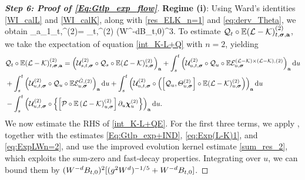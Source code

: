 \begin{proof}[\bf Step 6: Proof of \eqref{Eq:Gtlp_exp_flow}]
\noindent
\textbf{Regime (i)}: Using Ward's identities \eqref{WI_calL} and \eqref{WI_calK}, along with \eqref{res_ELK_n=1} and \eqref{eq:derv_Theta}, we obtain 
\be\label{eq:EPL-K}
_{a_1}\dthn_{t,\ba}^{(2)}= \dthn_{t,\ba}^{(2)} \prec (W^{-d}B_{t,0})^{3}.
\ee
To estimate $\mathcal Q_t\circ \mathbb{E} (\mathcal{L} - \mathcal{K})^{(2)}_{t, {\boldsymbol{\sigma}}, {\mathbf{a}}}$, we take the expectation of equation \eqref{int_K-L+Q} with $n=2$, yielding
\begin{align}\label{int_K-L+QE}
& {\mathcal Q}_t\circ  \mathbb{E}(\mathcal{L} - \mathcal{K})^{(2)}_{t, {\boldsymbol{\sigma}}, {\mathbf{a}}}   = 
\left(\mathcal{U}^{(2)}_{s, t, {\boldsymbol{\sigma}}} \circ  {\mathcal Q}_s\circ \mathbb{E}(\mathcal{L} - \mathcal{K})^{(2)}_{s, {\boldsymbol{\sigma}}}\right)_{{\mathbf{a}}} + \int_{s}^t \left(\mathcal{U}^{(2)}_{u, t, {\boldsymbol{\sigma}}} \circ  {\mathcal Q}_u\circ \mathbb{E} \mathcal{E}^{(\mathcal L-\mathcal K)\times(\mathcal L-\mathcal K),(2)}_{u, {\boldsymbol{\sigma}}}\right)_{{\mathbf{a}}} \mathrm{d} u \nonumber\\
& + \int_{s}^t \left(\mathcal{U}^{(2)}_{u, t, {\boldsymbol{\sigma}}} \circ  {\mathcal Q}_u\circ \mathbb{E}\mathcal{E}^{{\mathring G},(2)}_{u, {\boldsymbol{\sigma}}}\right)_{{\mathbf{a}}} \mathrm{d} u  + \int_{s}^t 
\left(\mathcal{U}^{(2)}_{u, t, {\boldsymbol{\sigma}}} 
\circ \left( \left[{\mathcal Q}_u , \varTheta^{(2)}_{u,{\boldsymbol{\sigma}}} \right]\circ \mathbb{E}(\mathcal{L} - \mathcal{K})^{(2)}_{u, {\boldsymbol{\sigma}} }\right) \right)_{{\mathbf{a}}} \mathrm{d} u \nonumber\\
& - \int_{s}^t \left(\mathcal{U}^{(2)}_{u, t, {\boldsymbol{\sigma}}} \circ \left\{\left[ {\mathcal P} \circ \mathbb{E}\left(\mathcal{L} - \mathcal{K}\right)^{(2)}_{u, {\boldsymbol{\sigma}}}\right] \partial_u\boldsymbol{\chi}_{u}^{(2)} \right\}\right)_{{\mathbf{a}}} \mathrm{d} u.
\end{align}
We now estimate the RHS of \eqref{int_K-L+QE}. For the first three terms, we apply , together with the estimates \eqref{Eq:Gtlp_exp+IND}, \eqref{eq:Exp(L-K)1}, and \eqref{eq:ExpLWn=2}, and use the improved evolution kernel estimate \eqref{sum_res_2}, which exploits the sum-zero and fast-decay properties. Integrating over $u$, we can bound them by $(W^{-d}B_{t,0})^{2}[(g^2W^d)^{-1/5}+W^{-d}B_{t,0}]$.



\end{proof}
